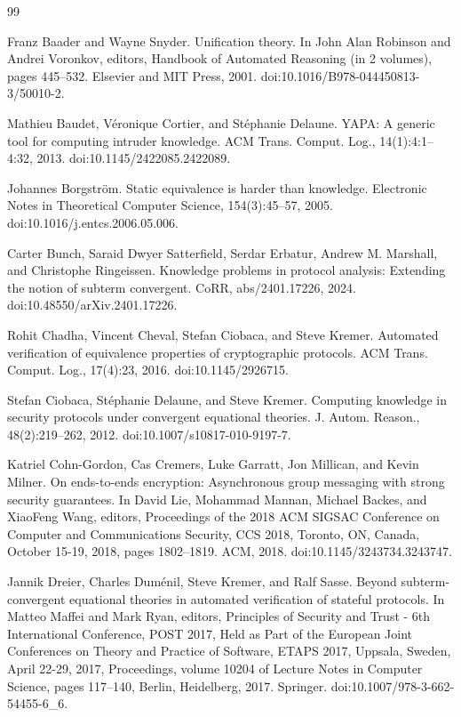 \documentclass[10pt,a4paper]{amsart}
\begin{document}
\begin{thebibliography}{99}
\par\noindent  [7]  Franz Baader and Wayne Snyder.  Unification theory.  In John Alan Robinson and Andrei Voronkov, editors, Handbook of Automated Reasoning (in 2 volumes), pages 445–532. Elsevier and MIT Press, 2001.  doi:10.1016/B978-044450813-3/50010-2.  
 
\par\noindent  [8]  Mathieu Baudet, Véronique Cortier, and Stéphanie Delaune.  YAPA: A generic tool for computing intruder knowledge.  ACM Trans. Comput. Log., 14(1):4:1–4:32, 2013.  doi:10.1145/2422085.2422089.  
 
\par\noindent  [9]  Johannes Borgström.  Static equivalence is harder than knowledge.  Electronic Notes in Theoretical Computer Science, 154(3):45–57, 2005.  doi:10.1016/j.entcs.2006.05.006.  
 
\par\noindent  [10]  Carter Bunch, Saraid Dwyer Satterfield, Serdar Erbatur, Andrew M. Marshall, and Christophe Ringeissen.  Knowledge problems in protocol analysis: Extending the notion of subterm convergent.  CoRR, abs/2401.17226, 2024.  doi:10.48550/arXiv.2401.17226.  
 
\par\noindent  [11]  Rohit Chadha, Vincent Cheval, Stefan Ciobaca, and Steve Kremer.  Automated verification of equivalence properties of cryptographic protocols.  ACM Trans. Comput. Log., 17(4):23, 2016.  doi:10.1145/2926715.  
 
\par\noindent  [12]  Stefan Ciobaca, Stéphanie Delaune, and Steve Kremer.  Computing knowledge in security protocols under convergent equational theories.  J. Autom. Reason., 48(2):219–262, 2012.  doi:10.1007/s10817-010-9197-7.  
 
\par\noindent  [13]  Katriel Cohn-Gordon, Cas Cremers, Luke Garratt, Jon Millican, and Kevin Milner.  On ends-to-ends encryption: Asynchronous group messaging with strong security guarantees.  In David Lie, Mohammad Mannan, Michael Backes, and XiaoFeng Wang, editors, Proceedings of the 2018 ACM SIGSAC Conference on Computer and Communications Security, CCS 2018, Toronto, ON, Canada, October 15-19, 2018, pages 1802–1819. ACM, 2018.  doi:10.1145/3243734.3243747.  
 
\par\noindent  [14]  Jannik Dreier, Charles Duménil, Steve Kremer, and Ralf Sasse.  Beyond subterm-convergent equational theories in automated verification of stateful protocols.  In Matteo Maffei and Mark Ryan, editors, Principles of Security and Trust - 6th International Conference, POST 2017, Held as Part of the European Joint Conferences on Theory and Practice of Software, ETAPS 2017, Uppsala, Sweden, April 22-29, 2017, Proceedings, volume 10204 of Lecture Notes in Computer Science, pages 117–140, Berlin, Heidelberg, 2017. Springer.  doi:10.1007/978-3-662-54455-6\_6.  
 

\end{thebibliography}
\end{document}
